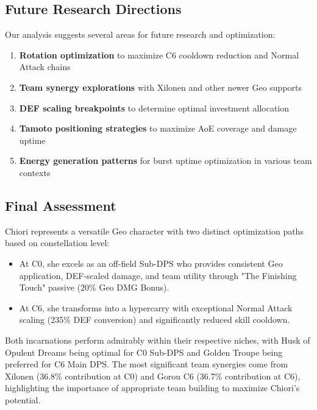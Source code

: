 \documentclass[12pt,a4paper]{article}
\begin{document}
\subsection{Future Research Directions}

Our analysis suggests several areas for future research and optimization:

\begin{enumerate}
    \item \textbf{Rotation optimization} to maximize C6 cooldown reduction and Normal Attack chains
    \item \textbf{Team synergy explorations} with Xilonen and other newer Geo supports
    \item \textbf{DEF scaling breakpoints} to determine optimal investment allocation
    \item \textbf{Tamoto positioning strategies} to maximize AoE coverage and damage uptime
    \item \textbf{Energy generation patterns} for burst uptime optimization in various team contexts
\end{enumerate}

\subsection{Final Assessment}

Chiori represents a versatile Geo character with two distinct optimization paths based on constellation level:

\begin{itemize}
    \item At C0, she excels as an off-field Sub-DPS who provides consistent Geo application, DEF-scaled damage, and team utility through "The Finishing Touch" passive (20\% Geo DMG Bonus).
    \item At C6, she transforms into a hypercarry with exceptional Normal Attack scaling (235\% DEF conversion) and significantly reduced skill cooldown.
\end{itemize}

Both incarnations perform admirably within their respective niches, with Husk of Opulent Dreams being optimal for C0 Sub-DPS and Golden Troupe being preferred for C6 Main DPS. The most significant team synergies come from Xilonen (36.8\% contribution at C0) and Gorou C6 (36.7\% contribution at C6), highlighting the importance of appropriate team building to maximize Chiori's potential.
\end{document}

